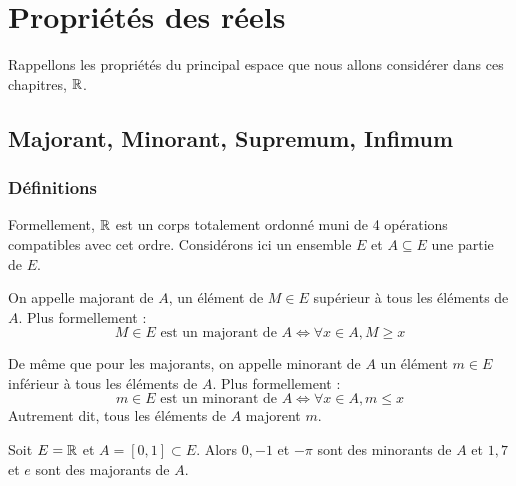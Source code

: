 \chapter{Propriétés des réels}

\justify

\setlength{\parindent}{0pt}


Rappellons les propriétés du principal espace que nous allons considérer dans ces chapitres, $\mathbb{R}$. 


\section{Majorant, Minorant, Supremum, Infimum}

\subsection{Définitions}

Formellement, $\mathbb{R}$ est un corps totalement ordonné muni de 4 opérations compatibles avec cet ordre. 
Considérons ici un ensemble $E$ et $A \subseteq E$ une partie de $E$. 

\begin{definition}[Majorant]
    On appelle majorant de $A$, un élément de $M \in E$ supérieur à tous les éléments de $A$. 
    Plus formellement :
        \[ M \in E \text{ est un majorant de } A \iff \forall x \in A, M \geqslant x \] 
\end{definition}

\begin{definition}[Minorant]
    De même que pour les majorants, on appelle minorant de $A$ un élément $m \in E$ inférieur à tous les éléments de $A$. 
    Plus formellement :
        \[ m \in E \text{ est un minorant de } A \iff \forall x \in A, m \leqslant x \] 
    Autrement dit, tous les éléments de $A$ majorent $m$.
\end{definition}

\begin{example}
    Soit $E = \mathbb{R}$ et $A = [0,1] \subset E$. Alors $0,-1$ et $-\pi$ sont des minorants de $A$
    et $1, 7$ et $ e$ sont des majorants de $A$. 
\end{example}

